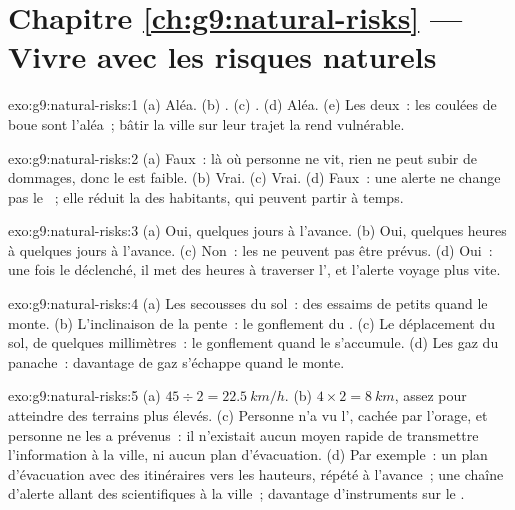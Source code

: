 \section*{Chapitre \ref{ch:g9:natural-risks} --- Vivre avec les risques naturels}

\begin{solution}{exo:g9:natural-risks:1}
(a) Aléa. (b) . (c) . (d) Aléa. (e) Les deux~:
les coulées de boue sont l'aléa~; bâtir la ville sur leur trajet la rend
vulnérable.
\end{solution}

\begin{solution}{exo:g9:natural-risks:2}
(a) Faux~: là où personne ne vit, rien ne peut subir de dommages, donc le
 est faible. (b) Vrai. (c) Vrai. (d) Faux~: une alerte ne change
pas le ~; elle réduit la  des habitants, qui peuvent
partir à temps.
\end{solution}

\begin{solution}{exo:g9:natural-risks:3}
(a) Oui, quelques jours à l'avance. (b) Oui, quelques heures à quelques
jours à l'avance. (c) Non~: les  ne peuvent pas être prévus.
(d) Oui~: une fois le  déclenché, il met des heures à traverser
l', et l'alerte voyage plus vite.
\end{solution}

\begin{solution}{exo:g9:natural-risks:4}
(a) Les secousses du sol~: des essaims de petits  quand le 
monte. (b) L'inclinaison de la pente~: le gonflement du . (c) Le
déplacement du sol, de quelques millimètres~: le gonflement quand le
 s'accumule. (d) Les gaz du panache~: davantage de gaz s'échappe
quand le  monte.
\end{solution}

\begin{solution}{exo:g9:natural-risks:5}
(a) $45 \div 2 = \qty{22.5}{km/h}$. (b) $4 \times 2 = \qty{8}{km}$, assez
pour atteindre des terrains plus élevés. (c) Personne n'a vu l',
cachée par l'orage, et personne ne les a prévenus~: il n'existait aucun
moyen rapide de transmettre l'information à la ville, ni aucun plan
d'évacuation. (d) Par exemple~: un plan d'évacuation avec des itinéraires
vers les hauteurs, répété à l'avance~; une chaîne d'alerte allant des
scientifiques à la ville~; davantage d'instruments sur le .
\end{solution}

